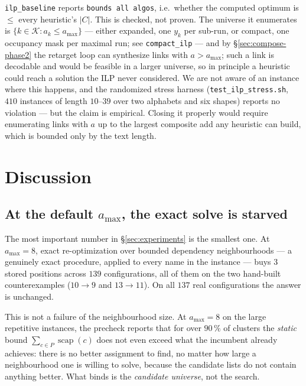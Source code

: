 \documentclass[11pt,a4paper]{article}
\theoremstyle{definition}
\theoremstyle{plain}
\theoremstyle{remark}
\newcommand{\Links}{\mathcal{K}}
\newcommand{\scap}{\operatorname{scap}}
\begin{document}
\texttt{ilp\_baseline} reports \texttt{bounds all algos}, i.e.\ whether
the computed optimum is $\le$ every heuristic's $|C|$. This is checked,
not proven. The universe it enumerates is
$\{k \in \Links : a_k \le a_{\max}\}$ --- either expanded, one $y_k$ per
sub-run, or compact, one occupancy mask per maximal run; see
\texttt{compact\_ilp} --- and by
\S\ref{sec:compose-phase2} the retarget loop can synthesize links with
$a > a_{\max}$; such a link is decodable and would be feasible in a
larger universe, so in principle a heuristic could reach a solution the
ILP never considered. We are not aware of an instance where this
happens, and the randomized stress harness (\texttt{test\_ilp\_stress.sh},
$410$ instances of length $10$--$39$ over two alphabets and six shapes)
reports no violation --- but the claim is empirical. Closing it properly
would require enumerating links with $a$ up to the largest composite add
any heuristic can build, which is bounded only by the text length.

\section{Discussion}
\label{sec:discussion}

\subsection{At the default $a_{\max}$, the exact solve is starved}

The most important number in \S\ref{sec:experiments} is the smallest one.
At $a_{\max} = 8$, exact re-optimization over bounded dependency
neighbourhoods --- a genuinely exact procedure, applied to every name in
the instance --- buys $3$ stored positions across $139$ configurations,
all of them on the two hand-built counterexamples ($10 \to 9$ and
$13 \to 11$). On all $137$ real configurations the answer is unchanged.

This is not a failure of the neighbourhood size. At $a_{\max} = 8$ on the
large repetitive instances, the precheck reports that for over $90\,\%$
of clusters the \emph{static} bound $\sum_{c \in P} \scap(c)$ does not
even exceed what the incumbent already achieves: there is no better
assignment to find, no matter how large a neighbourhood one is willing to
solve, because the candidate lists do not contain anything better. What
binds is the \emph{candidate universe}, not the search.
\end{document}
